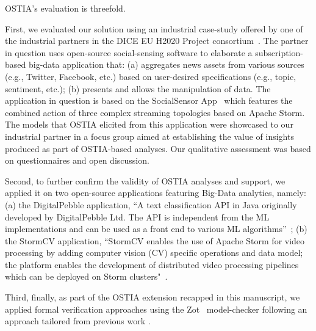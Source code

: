 OSTIA's evaluation is threefold. 

First, we evaluated our solution using an industrial case-study offered by one of the industrial partners in the DICE EU H2020 Project consortium~\cite{dice2020}.
The
partner in question uses open-source social-sensing software to elaborate a
subscription-based big-data application that: (a) aggregates news assets from
various sources (e.g., Twitter, Facebook, etc.) based on user-desired
specifications (e.g., topic, sentiment, etc.); (b) presents and allows the
manipulation of data. The application in question is based on the SocialSensor
App~\cite{socialsensor}
%
which features the combined
action of three complex streaming topologies based on Apache Storm. The
models that OSTIA elicited from this application were showcased to our
industrial partner in a focus group aimed at establishing the value of insights
produced as part of OSTIA-based analyses. Our qualitative assessment was based
on questionnaires and open discussion.

Second, to further confirm the validity of OSTIA analyses and support, we
applied it on two open-source applications featuring Big-Data analytics, namely: (a) the DigitalPebble application,
``A text classification API in Java originally developed by DigitalPebble Ltd.
The API is independent from the ML implementations and can be used as a front
end to various ML algorithms''~\cite{storm-crawler}; (b) the StormCV application, 
``StormCV
enables the use of Apache Storm for video processing by adding computer vision
(CV) specific operations and data model; the platform enables the development of
distributed video processing pipelines which can be deployed on Storm clusters"~\cite{stormCV}.

Third, finally, as part of the OSTIA extension recapped in this manuscript, we applied formal verification approaches using the
Zot~\cite{zot}
model-checker following an approach tailored from previous work \cite{icsoft,BRS15}.

